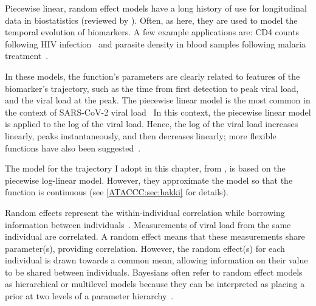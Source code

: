 \documentclass[thesis.tex]{subfiles}
\begin{document}
Piecewise linear, random effect models have a long history of use for longitudinal data in biostatistics (reviewed by \textcite{slateStatistical}).
Often, as here, they are used to model the temporal evolution of biomarkers.
A few example applications are: CD4 counts following HIV infection~\autocite{langeHierarchical,lynchPredicting} and parasite density in blood samples following malaria treatment~\autocite{fogartyBayesian}.

In these models, the function's parameters are clearly related to features of the biomarker's trajectory, such as the time from first detection to peak viral load, and the viral load at the peak.
The piecewise linear model is the most common in the context of SARS-CoV-2 viral load~\autocite[e.g.][]{clearyUsing,kisslerViral,larremoreTest}
In this context, the piecewise linear model is applied to the log of the viral load.
Hence, the log of the viral load increases linearly, peaks instantaneously, and then decreases linearly; more flexible functions have also been suggested~\autocite{quiltyQuarantine}.

The model for the trajectory I adopt in this chapter, from \textcite{hakkiOnset}, is based on the piecewise log-linear model.
However, they approximate the model so that the function is continuous (see \cref{ATACCC:sec:hakki} for details).

Random effects represent the within-individual correlation while borrowing information between individuals~\autocite[chapter 24]{lashModern}.
Measurements of viral load from the same individual are correlated.
A random effect means that these measurements share parameter(s), providing correlation.
However, the random effect(s) for each individual is drawn towards a common mean, allowing information on their value to be shared between individuals.
Bayesians often refer to random effect models as hierarchical or multilevel models because they can be interpreted as placing a prior at two levels of a parameter hierarchy~\autocite[chapter 5]{gelmanBDA}.
\end{document}
